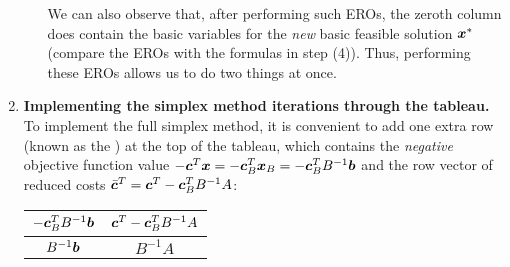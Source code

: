 \begin{enumerate}
\begin{itemize}
We can also observe that, after performing such EROs, the zeroth column does
contain the basic variables for the \emph{new} basic feasible solution \(\bm{x}^{*}\)
(compare the EROs with the formulas in step (4)). Thus, performing these EROs
allows us to do two things at once.
\begin{center}
\end{center}
\end{itemize}
\item \label{it:tableau-implement} \textbf{Implementing the simplex method
iterations through the tableau.} To implement the full simplex method, it is
convenient to add one extra row (known as the ) at the top of
the tableau, which contains the \emph{negative} objective function value
\(-\bm{c}^{T}\bm{x}=-\bm{c}_{B}^{T}\bm{x}_{B}=-\bm{c}_{B}^{T}B^{-1}\bm{b}\) and the row
vector of reduced costs
\(\bar{\bm{c}}^{T}=\bm{c}^{T}-\bm{c}_{B}^{T}B^{-1}A\):
\begin{center}
\begin{tabular}{cc}
\toprule
\(-\bm{c}_{B}^{T}B^{-1}\bm{b}\)&\(\bm{c}^{T}-\bm{c}_{B}^{T}B^{-1}A\) \\
\midrule
\(B^{-1}\bm{b}\)&\(B^{-1}A\) \\
\bottomrule
\end{tabular}
\end{center}

\end{enumerate}
